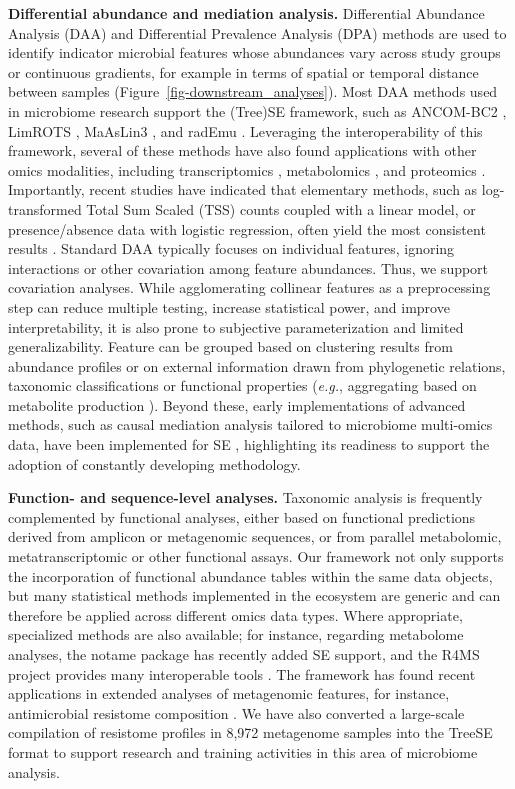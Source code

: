 \documentclass[
  sn-nature,
]{sn-jnl}
\begin{document}
\textbf{Differential abundance and mediation analysis.} Differential
Abundance Analysis (DAA) and Differential Prevalence Analysis (DPA)
methods are used to identify indicator microbial features whose
abundances vary across study groups or continuous gradients, for example
in terms of spatial or temporal distance between samples
(Figure~\ref{fig-downstream_analyses}). Most DAA methods used in
microbiome research support the (Tree)SE framework, such as ANCOM-BC2
\citep{lin2024}, LimROTS \citep{anwar2025}, MaAsLin3
\citep{nickols2024}, and radEmu \citep{clausen2024}. Leveraging the
interoperability of this framework, several of these methods have also
found applications with other omics modalities, including
transcriptomics \citep{love2014}, metabolomics \citep{nickols2024}, and
proteomics \citep{anwar2025}. Importantly, recent studies have indicated
that elementary methods, such as log-transformed Total Sum Scaled (TSS)
counts coupled with a linear model, or presence/absence data with
logistic regression, often yield the most consistent results
\citep{pelto2025, gamboa-tuz2025}. Standard DAA typically focuses on
individual features, ignoring interactions or other covariation among
feature abundances. Thus, we support covariation analyses. While
agglomerating collinear features as a preprocessing step can reduce
multiple testing, increase statistical power, and improve
interpretability, it is also prone to subjective parameterization and
limited generalizability. Feature can be grouped based on clustering
results from abundance profiles or on external information drawn from
phylogenetic relations, taxonomic classifications or functional
properties (\emph{e.g.}, aggregating based on metabolite production
\citep{kullberg2024}). Beyond these, early implementations of advanced
methods, such as causal mediation analysis tailored to microbiome
multi-omics data, have been implemented for SE \citep{jiang2025},
highlighting its readiness to support the adoption of constantly
developing methodology.

\textbf{Function- and sequence-level analyses.} Taxonomic analysis is
frequently complemented by functional analyses, either based on
functional predictions derived from amplicon or metagenomic sequences,
or from parallel metabolomic, metatranscriptomic or other functional
assays. Our framework not only supports the incorporation of functional
abundance tables within the same data objects, but many statistical
methods implemented in the ecosystem are generic and can therefore be
applied across different omics data types. Where appropriate,
specialized methods are also available; for instance, regarding
metabolome analyses, the notame package \citep{klavus2020} has recently
added SE support, and the R4MS project provides many interoperable tools
\citep{gatto2025}. The framework has found recent applications in
extended analyses of metagenomic features, for instance, antimicrobial
resistome composition \citep{salehi2025}. We have also converted a
large-scale compilation of resistome profiles in 8,972 metagenome
samples \citep{lee2023} into the TreeSE format to support research and
training activities in this area of microbiome analysis.
\end{document}
